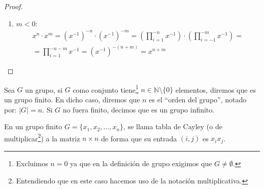 \begin{prop}
\begin{proof}
\begin{enumerate}
\begin{enumerate}
            \item \ul{$m<0$}:
            \begin{multline*}
                x^n \cdot x^m =\left(x^{-1}\right)^{-n} \cdot\left(x^{-1}\right)^{-m}
                = \left(\prod_{i=1}^{-n} x^{-1}\right) \cdot\left(\prod_{i=-1}^{-m} x^{-1}\right) =\\
                = \prod_{i=1}^{-n-m} x^{-1} = \left(x^{-1}\right)^{-(n+m)} = x^{n+m}
            \end{multline*}
        \end{enumerate}
    \end{enumerate}
    \end{proof}
\end{prop}

\begin{definicion}
    Sea $G$ un grupo, si $G$ como conjunto tiene\footnote{Excluimos $n= 0$ ya que en la definición de grupo exigimos que $G\neq \emptyset $.} $n\in \mathbb{N}\setminus\{0\}$ elementos, diremos que es un grupo finito. En dicho caso, diremos que $n$ es el ``orden del grupo'', notado por: $|G| = n$.\newline
    Si $G$ no fuera finito, decimos que es un grupo infinito.
\end{definicion}

\begin{definicion}
    En un grupo finito $G=\{x_1,x_2,\ldots,x_n\}$, se llama tabla de Cayley (o de multiplicar\footnote{Entendiendo que en este caso hacemos uso de la notación multiplicativa.}) a la matriz $n\times n$ de forma que su entrada $(i,j)$ es $x_ix_j$.
\end{definicion}

